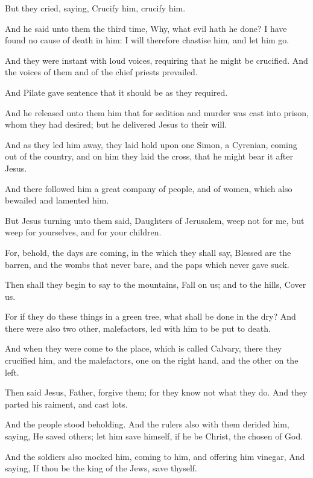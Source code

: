 \Verse But they cried, saying, Crucify him, crucify him.

\Verse And he said unto them the third time, Why, what evil hath he done? I have found no cause of death in him: I will therefore chastise him, and let him go.

\Verse And they were instant with loud voices, requiring that he might be crucified. And the voices of them and of the chief priests prevailed.

\Verse And Pilate gave sentence that it should be as they required.

\Verse And he released unto them him that for sedition and murder was cast into prison, whom they had desired; but he delivered Jesus to their will.

\Verse And as they led him away, they laid hold upon one Simon, a Cyrenian, coming out of the country, and on him they laid the cross, that he might bear it after Jesus.

\Verse And there followed him a great company of people, and of women, which also bewailed and lamented him.

\Verse But Jesus turning unto them said, Daughters of Jerusalem, weep not for me, but weep for yourselves, and for your children.

\Verse For, behold, the days are coming, in the which they shall say, Blessed are the barren, and the wombs that never bare, and the paps which never gave suck.

\Verse Then shall they begin to say to the mountains, Fall on us; and to the hills, Cover us.

\Verse For if they do these things in a green tree, what shall be done in the dry?  \Verse And there were also two other, malefactors, led with him to be put to death.

\Verse And when they were come to the place, which is called Calvary, there they crucified him, and the malefactors, one on the right hand, and the other on the left.

\Verse Then said Jesus, Father, forgive them; for they know not what they do. And they parted his raiment, and cast lots.

\Verse And the people stood beholding. And the rulers also with them derided him, saying, He saved others; let him save himself, if he be Christ, the chosen of God.

\Verse And the soldiers also mocked him, coming to him, and offering him vinegar, \Verse And saying, If thou be the king of the Jews, save thyself.


